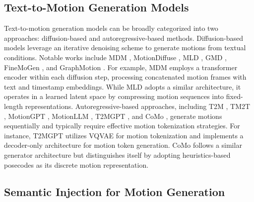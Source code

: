 \subsection{Text-to-Motion Generation Models}

Text-to-motion generation models can be broadly categorized into two approaches: diffusion-based and autoregressive-based methods. 
Diffusion-based models leverage an iterative denoising scheme \cite{dhariwal2021diffusion} to generate motions from textual conditions. 
Notable works include MDM \cite{tevet2023human}, MotionDiffuse \cite{zhang2022motiondiffuse}, MLD \cite{chen2023executing}, GMD \cite{karunratanakul2023gmd}, FineMoGen \cite{zhang2023finemogen}, and GraphMotion \cite{jin2023act}. For example, MDM employs a transformer encoder within each diffusion step, processing concatenated motion frames with text and timestamp embeddings. While MLD adopts a similar architecture, it operates in a learned latent space by compressing motion sequences into fixed-length representations.
Autoregressive-based approaches, including T2M \cite{zhang2023generating}, TM2T \cite{guo2022tm2t}, MotionGPT \cite{jiang2024motiongpt}, MotionLLM \cite{chen2024motionllm}, T2MGPT \cite{zhang2023generating}, and CoMo \cite{huang2024como}, generate motions sequentially and typically require effective motion tokenization strategies. 
For instance, T2MGPT utilizes VQVAE \cite{van2017neural} for motion tokenization and implements a decoder-only architecture for motion token generation. CoMo follows a similar generator architecture but distinguishes itself by adopting heuristics-based posecodes \cite{delmas2022posescript} as its discrete motion representation.




\vspace{-2mm}
\subsection{Semantic Injection for Motion Generation}
\vspace{-1mm}

